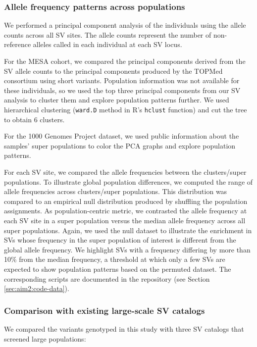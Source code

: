\documentclass[11pt]{ucscthesis}
\begin{document}
\subsubsection{Allele frequency patterns across populations}
\label{subsec:aim2:sv-pop-freq}


We performed a principal component analysis of the individuals using the allele counts across all SV sites.
The allele counts represent the number of non-reference alleles called in each individual at each SV locus.

For the MESA cohort, we compared the principal components derived from the SV allele counts to the principal components produced by the TOPMed consortium using short variants.
Population information was not available for these individuals, so we used the top three principal components from our SV analysis to cluster them and explore population patterns further.
We used hierarchical clustering (\verb!ward.D! method in R's \verb!hclust! function) and cut the tree to obtain 6 clusters.

For the 1000 Genomes Project dataset, we used public information about the samples' super populations to color the PCA graphs and explore population patterns.

For each SV site, we compared the allele frequencies between the clusters/super populations.
To illustrate global population differences, we computed the range of allele frequencies across clusters/super populations.
This distribution was compared to an empirical null distribution produced by shuffling the population assignments.
As population-centric metric, we contrasted the allele frequency at each SV site in a super population versus the median allele frequency across all super populations.
Again, we used the null dataset to illustrate the enrichment in SVs whose frequency in the super population of interest is different from the global allele frequency.
We highlight SVs with a frequency differing by more than 10\% from the median frequency, a threshold at which only a few SVs are expected to show population patterns based on the permuted dataset.
The corresponding scripts are documented in the repository (see Section \ref{sec:aim2:code-data}).

\subsubsection{Comparison with existing large-scale SV catalogs}

We compared the variants genotyped in this study with three SV catalogs that screened large populations:
\end{document}
